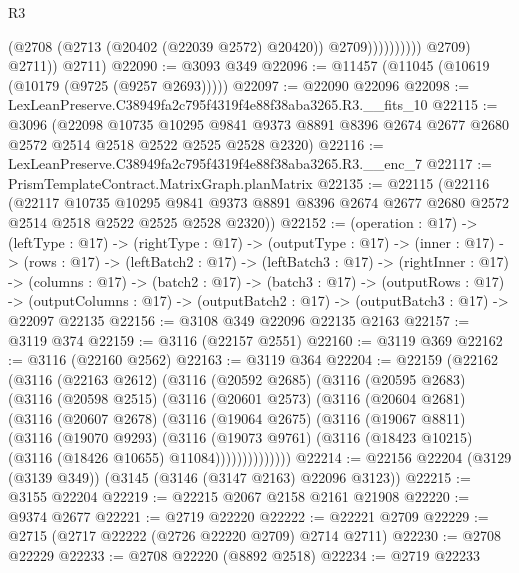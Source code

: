 \begin{lexlean}{R3}
\begin{coremodule}
                              (@2708 (@2713 (@20402 (@22039 @2572) @20420)) @2709))))))))))
            @2709)
          @2711))
      @2711)
@22090 := @3093 @349
@22096 := @11457 (@11045 (@10619 (@10179 (@9725 (@9257 @2693)))))
@22097 := @22090 @22096
@22098 := LexLeanPreserve.C38949fa2c795f4319f4e88f38aba3265.R3.__fits_10
@22115 := @3096
    (@22098
      @10735
      @10295
      @9841
      @9373
      @8891
      @8396
      @2674
      @2677
      @2680
      @2572
      @2514
      @2518
      @2522
      @2525
      @2528
      @2320)
@22116 := LexLeanPreserve.C38949fa2c795f4319f4e88f38aba3265.R3.__enc_7
@22117 := PrismTemplateContract.MatrixGraph.planMatrix
@22135 := @22115
    (@22116
      (@22117
        @10735
        @10295
        @9841
        @9373
        @8891
        @8396
        @2674
        @2677
        @2680
        @2572
        @2514
        @2518
        @2522
        @2525
        @2528
        @2320))
@22152 := (operation : @17) ->
  (leftType : @17) ->
  (rightType : @17) ->
  (outputType : @17) ->
  (inner : @17) ->
  (rows : @17) ->
  (leftBatch2 : @17) ->
  (leftBatch3 : @17) ->
  (rightInner : @17) ->
  (columns : @17) ->
  (batch2 : @17) ->
  (batch3 : @17) ->
  (outputRows : @17) ->
  (outputColumns : @17) -> (outputBatch2 : @17) -> (outputBatch3 : @17) -> @22097 @22135
@22156 := @3108 @349 @22096 @22135 @2163
@22157 := @3119 @374
@22159 := @3116 (@22157 @2551)
@22160 := @3119 @369
@22162 := @3116 (@22160 @2562)
@22163 := @3119 @364
@22204 := @22159
    (@22162
      (@3116
        (@22163 @2612)
        (@3116
          (@20592 @2685)
          (@3116
            (@20595 @2683)
            (@3116
              (@20598 @2515)
              (@3116
                (@20601 @2573)
                (@3116
                  (@20604 @2681)
                  (@3116
                    (@20607 @2678)
                    (@3116
                      (@19064 @2675)
                      (@3116
                        (@19067 @8811)
                        (@3116
                          (@19070 @9293)
                          (@3116
                            (@19073 @9761)
                            (@3116 (@18423 @10215) (@3116 (@18426 @10655) @11084))))))))))))))
@22214 := @22156 @22204 (@3129 (@3139 @349)) (@3145 (@3146 (@3147 @2163) @22096 @3123))
@22215 := @3155 @22204
@22219 := @22215 @2067 @2158 @2161 @21908
@22220 := @9374 @2677
@22221 := @2719 @22220
@22222 := @22221 @2709
@22229 := @2715 (@2717 @22222 (@2726 @22220 @2709) @2714 @2711)
@22230 := @2708 @22229
@22233 := @2708 @22220 (@8892 @2518)
@22234 := @2719 @22233

\end{coremodule}
\end{lexlean}

